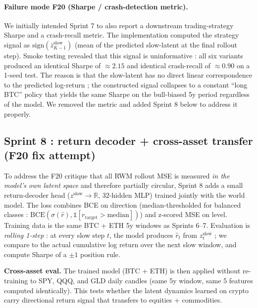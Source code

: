 \documentclass[11pt,a4paper]{article}
\begin{document}
\paragraph{Failure mode F20 (Sharpe / crash-detection metric).}
We initially intended Sprint 7 to also report a downstream
trading-strategy Sharpe and a crash-recall metric. The
implementation computed the strategy signal as
$\mathrm{sign}(\bar{z}^{\text{slow}}_{K-1})$ (mean of the
predicted slow-latent at the final rollout step). Smoke testing
revealed that this signal is uninformative : all six variants
produced an identical Sharpe of $\approx 2.15$ and identical
crash-recall of $\approx 0.90$ on a 1-seed test. The reason is
that the slow-latent has no direct linear correspondence to the
predicted log-return ; the constructed signal collapses to a
constant ``long BTC'' policy that yields the same Sharpe on the
bull-biased 5y period regardless of the model. We removed the
metric and added Sprint 8 below to address it properly.

\subsection{Sprint 8 : return decoder + cross-asset transfer (F20 fix attempt)}
\label{sec:rwm-sprint8}

To address the F20 critique that all RWM rollout MSE is measured
\emph{in the model's own latent space} and therefore partially
circular, Sprint 8 adds a small return-decoder head
($z^{\text{slow}} \!\to\! \mathbb{R}$, 32-hidden MLP) trained
jointly with the world model. The loss combines BCE on direction
(median-thresholded for balanced classes : $\mathrm{BCE}(
\sigma(\hat{r}), \mathbb{1}[r_{\text{target}} > \mathrm{median}])
$) and z-scored MSE on level. Training data is
the same BTC + ETH 5y windows as Sprints 6--7. Evaluation is
\emph{rolling 1-step} : at every slow step $t$, the model produces
$\hat{r}_t$ from $z^{\text{slow}}_t$ ; we compare to the actual
cumulative log return over the next slow window, and compute
Sharpe of a $\pm 1$ position rule.

\textbf{Cross-asset eval.} The trained model (BTC + ETH) is then
applied without re-training to SPY, QQQ, and GLD daily candles
(same 5y window, same 5 features computed identically). This
tests whether the latent dynamics learned on crypto carry
directional return signal that transfers to equities + commodities.
\end{document}
